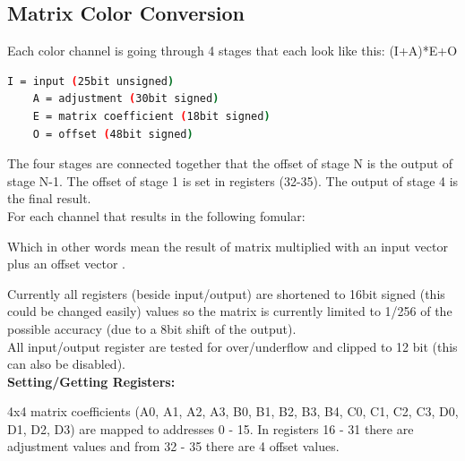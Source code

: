 {\subsection{Matrix Color Conversion} %

Each color channel is going through 4 stages that each look like this: (I+A)*E+O 

\begin{lstlisting}[language=bash,morekeywords=$,keywordstyle=\bfseries,frame=none,xleftmargin=.25in,belowskip=2em, aboveskip=2em]
    I = input (25bit unsigned)
    A = adjustment (30bit signed)
    E = matrix coefficient (18bit signed)
    O = offset (48bit signed)
\end{lstlisting}

The four stages are connected together that the offset of stage N is the output of stage N-1. The offset of stage 1 is set in registers (32-35). The output of stage 4 is the final result.\\


For each channel that results in the following fomular: 


Which in other words mean the result of matrix  multiplied with an input vector  plus an offset vector .

Currently all registers (beside input/output) are shortened to 16bit signed (this could be changed easily) values so the matrix is currently limited to 1/256 of the possible accuracy (due to a 8bit shift of the output).\\

All input/output register are tested for over/underflow and clipped to 12 bit (this can also be disabled).\\ 

\textbf{Setting/Getting Registers: }\\


    
4x4 matrix coefficients (A0, A1, A2, A3, B0, B1, B2, B3, B4, C0, C1, C2, C3, D0, D1, D2, D3) are mapped to addresses 0 - 15. In registers 16 - 31 there are adjustment values and from 32 - 35 there are 4 offset values.\\

}
